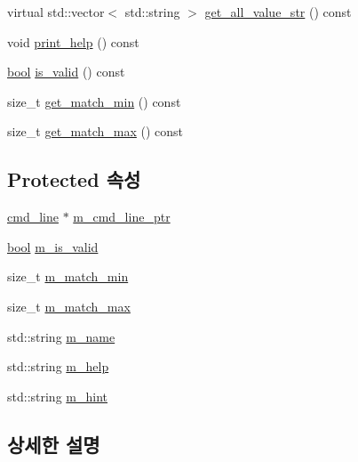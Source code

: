 \begin{DoxyCompactItemize}
\item 
virtual std\+::vector$<$ std\+::string $>$ \hyperlink{classcli__argument_a3db4f59a61184261b69eb347d37ee066}{get\+\_\+all\+\_\+value\+\_\+str} () const 
\item 
void \hyperlink{classcli__argument_a695407d45700941d937b4c11c6b140d1}{print\+\_\+help} () const 
\item 
\hyperlink{avb__gptp_8h_af6a258d8f3ee5206d682d799316314b1}{bool} \hyperlink{classcli__argument_a73e929d29381f1d792af13350b79222c}{is\+\_\+valid} () const 
\item 
size\+\_\+t \hyperlink{classcli__argument_a513ea3e90c4e9f5f32dbb57b4e989280}{get\+\_\+match\+\_\+min} () const 
\item 
size\+\_\+t \hyperlink{classcli__argument_abc7abd92891ff2380bbaf15b99eb6394}{get\+\_\+match\+\_\+max} () const 
\end{DoxyCompactItemize}
\subsection*{Protected 속성}
\begin{DoxyCompactItemize}
\item 
\hyperlink{classcmd__line}{cmd\+\_\+line} $\ast$ \hyperlink{classcli__argument_a802ef904236d4228f1b8edb3a96eb9cd}{m\+\_\+cmd\+\_\+line\+\_\+ptr}
\item 
\hyperlink{avb__gptp_8h_af6a258d8f3ee5206d682d799316314b1}{bool} \hyperlink{classcli__argument_a3163252d457c8ef3a286a8538d7e319f}{m\+\_\+is\+\_\+valid}
\item 
size\+\_\+t \hyperlink{classcli__argument_a9e9208481670105577821d0a1aee5179}{m\+\_\+match\+\_\+min}
\item 
size\+\_\+t \hyperlink{classcli__argument_a6f9fd009acee86b73a9f1b8e80a95b43}{m\+\_\+match\+\_\+max}
\item 
std\+::string \hyperlink{classcli__argument_adb41893ba19e889e56c559f25fc1a68a}{m\+\_\+name}
\item 
std\+::string \hyperlink{classcli__argument_a3985971d45415a337f60ed183b445c96}{m\+\_\+help}
\item 
std\+::string \hyperlink{classcli__argument_a3feeeba99be6bb94b8fa0ebc88ef09cf}{m\+\_\+hint}
\end{DoxyCompactItemize}


\subsection{상세한 설명}


